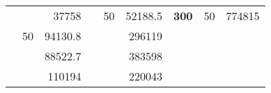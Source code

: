 \begin{table}[H]
\begin{tabular}{|ccrccrccc}
\rowcolor[HTML]{DDFDFF} 
\multicolumn{1}{|c|}{\cellcolor[HTML]{FFFFC7}}                                & \multicolumn{1}{c|}{\cellcolor[HTML]{DDFDFF}}                      & \multicolumn{1}{r|}{\cellcolor[HTML]{DAE8FC}37758}     & \multicolumn{1}{c|}{\cellcolor[HTML]{FFFFC7}}                                & \multicolumn{1}{c|}{\multirow{-10}{*}{\cellcolor[HTML]{DDFDFF}50}}  & \multicolumn{1}{r|}{\cellcolor[HTML]{DDFDFF}52188.5}   & \multicolumn{1}{c|}{\multirow{-19}{*}{\cellcolor[HTML]{FFFFC7}\textbf{300}}} & \multicolumn{1}{c|}{\multirow{-10}{*}{\cellcolor[HTML]{DDFDFF}50}} & \multicolumn{1}{r|}{\cellcolor[HTML]{DDFDFF}774815}    \\ \cline{3-3} \cline{5-9} 
\multicolumn{1}{|c|}{\cellcolor[HTML]{FFFFC7}}                                & \multicolumn{1}{c|}{\multirow{-10}{*}{\cellcolor[HTML]{DDFDFF}50}} & \multicolumn{1}{r|}{\cellcolor[HTML]{DDFDFF}94130.8}   & \multicolumn{1}{c|}{\cellcolor[HTML]{FFFFC7}}                                & \multicolumn{1}{c|}{\cellcolor[HTML]{DAE8FC}}                       & \multicolumn{1}{r|}{\cellcolor[HTML]{DAE8FC}296119}    &                                                                              &                                                                    &                                                        \\ \cline{2-3} \cline{6-6}
\multicolumn{1}{|c|}{\cellcolor[HTML]{FFFFC7}}                                & \multicolumn{1}{c|}{\cellcolor[HTML]{DAE8FC}}                      & \multicolumn{1}{r|}{\cellcolor[HTML]{DAE8FC}88522.7}   & \multicolumn{1}{c|}{\cellcolor[HTML]{FFFFC7}}                                & \multicolumn{1}{c|}{\cellcolor[HTML]{DAE8FC}}                       & \multicolumn{1}{r|}{\cellcolor[HTML]{DDFDFF}383598}    &                                                                              &                                                                    &                                                        \\ \cline{3-3} \cline{6-6}
\multicolumn{1}{|c|}{\cellcolor[HTML]{FFFFC7}}                                & \multicolumn{1}{c|}{\cellcolor[HTML]{DAE8FC}}                      & \multicolumn{1}{r|}{\cellcolor[HTML]{DDFDFF}110194}    & \multicolumn{1}{c|}{\cellcolor[HTML]{FFFFC7}}                                & \multicolumn{1}{c|}{\cellcolor[HTML]{DAE8FC}}                       & \multicolumn{1}{r|}{\cellcolor[HTML]{DAE8FC}220043}    &                                                                              &                                                                    &                                                        \\ \cline{3-3} \cline{6-6}

\end{tabular}
\end{table}
